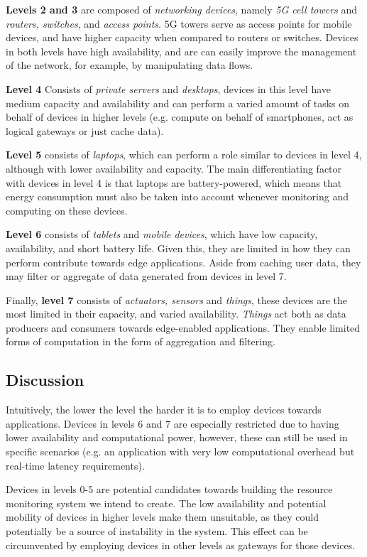 \textbf{Levels 2 and 3} are composed of \textit{networking devices}, namely 
\textit{5G cell towers} and \textit{routers, switches}, and \textit{access points}. 5G towers serve as access points for mobile devices, and have higher capacity when compared to routers or switches. Devices in both levels have high availability, and are can easily improve the management of the network, for example, by manipulating data flows.

\textbf{Level 4} Consists of \textit{private servers} and \textit{desktops}, devices in this level have medium capacity and availability and can perform a varied amount of tasks on behalf of devices in higher levels (e.g. compute on behalf of smartphones, act as logical gateways or just cache data). 

\textbf{Level 5} consists of \textit{laptops}, which can perform a role similar to devices in level 4, although with lower availability and capacity. The main differentiating factor with devices in level 4 is that laptops are battery-powered, which means that energy consumption must also be taken into account whenever monitoring and computing on these devices. 

\textbf{Level 6} consists of \textit{tablets} and \textit{mobile devices}, which have low capacity, availability, and short battery life. Given this, they are limited in how they can perform contribute towards edge applications. Aside from caching user data, they may filter or aggregate of data generated from devices in level 7. 

Finally, \textbf{level 7} consists of \textit{actuators, sensors} and \textit{things}, these devices are the most limited in their capacity, and varied availability. \textit{Things} act both as data producers and consumers towards edge-enabled applications. They enable limited forms of computation in the form of aggregation and filtering.

\subsection{Discussion}

Intuitively, the lower the level the harder it is to employ devices towards applications. Devices in levels 6 and 7 are especially restricted due to having lower availability and computational power, however, these can still be used in specific scenarios (e.g. an application with very low computational overhead but real-time latency requirements). 

Devices in levels 0-5 are potential candidates towards building the resource monitoring system we intend to create. The low availability and potential mobility of devices in higher levels make them unsuitable, as they could potentially be a source of instability in the system. This effect can be circumvented by employing devices in other levels as gateways for those devices.